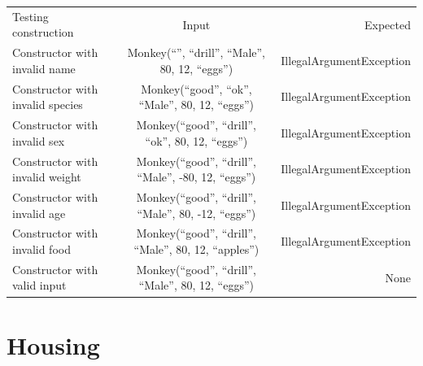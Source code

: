 \documentclass[12pt]{amsart}
\begin{document}
\begin{table}[htbp]
   \begin{tabular}{@{} lcr @{}} %

      Testing construction      & Input & Expected \\
         Constructor with invalid name       & Monkey(``'', ``drill'', ``Male'', 80, 12, ``eggs'')     &  IllegalArgumentException \\
         Constructor with invalid species       & Monkey(``good'', ``ok'', ``Male'', 80, 12, ``eggs'')     &  IllegalArgumentException \\
         Constructor with invalid sex       & Monkey(``good'', ``drill'', ``ok'', 80, 12, ``eggs'')     &  IllegalArgumentException \\
         Constructor with invalid weight       & Monkey(``good'', ``drill'', ``Male'', -80, 12, ``eggs'')     &  IllegalArgumentException \\
         Constructor with invalid age       & Monkey(``good'', ``drill'', ``Male'', 80, -12, ``eggs'')     &  IllegalArgumentException \\
         Constructor with invalid food       & Monkey(``good'', ``drill'', ``Male'', 80, 12, ``apples'')     &  IllegalArgumentException \\
         Constructor with valid input       & Monkey(``good'', ``drill'', ``Male'', 80, 12, ``eggs'')     &  None \\
    \end{tabular}
\end{table}


\section{Housing}
\end{document}

